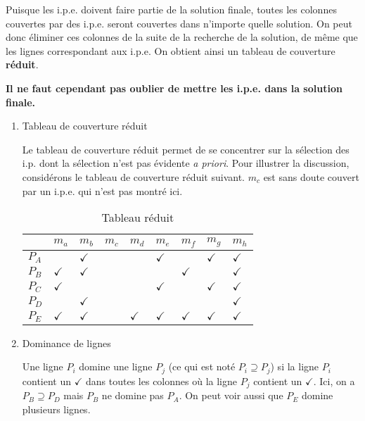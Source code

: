 \documentclass[letter, oneside]{book}
\begin{document}
Puisque les i.p.e. doivent faire partie de la solution finale, toutes
les colonnes couvertes par des i.p.e. seront couvertes dans n'importe
quelle solution. On peut donc éliminer ces colonnes de la suite de la
recherche de la solution, de même que les lignes correspondant aux
i.p.e. On obtient ainsi un tableau de couverture \textbf{réduit}.

\textbf{Il ne faut cependant pas oublier de mettre les i.p.e. dans la solution
finale.}

\begin{enumerate}
\item Tableau de couverture réduit
\label{sec:org52082fb}

Le tableau de couverture réduit permet de se concentrer sur la
sélection des i.p. dont la sélection n'est pas évidente \emph{a
priori}. Pour illustrer la discussion, considérons le tableau de
couverture réduit suivant. \(m_c\) est sans doute couvert par un
i.p.e. qui n'est pas montré ici.

\begin{table}[htbp]
\caption{\label{tab:orgf4e22dd}Tableau réduit}
\centering
\begin{tabular}{lllllllll}
 & \(m_a\) & \(m_b\) & \(m_c\) & \(m_d\) & \(m_e\) & \(m_f\) & \(m_g\) & \(m_h\)\\[0pt]
\hline
\(P_A\) &  & \(\checkmark\) &  &  & \(\checkmark\) &  & \(\checkmark\) & \(\checkmark\)\\[0pt]
\(P_B\) & \(\checkmark\) & \(\checkmark\) &  &  &  & \(\checkmark\) &  & \(\checkmark\)\\[0pt]
\(P_C\) & \(\checkmark\) &  &  &  & \(\checkmark\) &  & \(\checkmark\) & \(\checkmark\)\\[0pt]
\(P_D\) &  & \(\checkmark\) &  &  &  &  &  & \(\checkmark\)\\[0pt]
\(P_E\) & \(\checkmark\) & \(\checkmark\) &  & \(\checkmark\) & \(\checkmark\) & \(\checkmark\) & \(\checkmark\) & \(\checkmark\)\\[0pt]
\end{tabular}
\end{table}


\item Dominance de lignes
\label{sec:org49448e5}

Une ligne \(P_i\) domine une ligne \(P_j\) (ce qui est noté \(P_i \supseteq
P_j\)) si la ligne \(P_i\) contient un \(\checkmark\) dans toutes les colonnes où
la ligne \(P_j\) contient un \(\checkmark\). Ici, on a \(P_B \supseteq P_D\) mais
\(P_B\) ne domine pas \(P_A\). On peut voir aussi que \(P_E\) domine
plusieurs lignes.


\end{enumerate}
\end{document}
